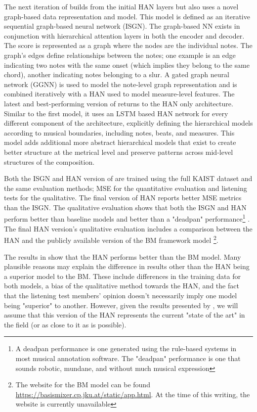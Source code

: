 The next iteration of \vnet{} builds from the initial HAN layers but also uses a novel graph-based data representation and model. This model is defined as an iterative sequential graph-based neural network (ISGN). The graph-based NN exists in conjunction with hierarchical attention layers in both the encoder and decoder. The score is represented as a graph where the nodes are the individual notes. The graph's edges define relationships between the notes; one example is an edge indicating two notes with the same onset (which implies they belong to the same chord), another indicating notes belonging to a slur. A gated graph neural network (GGNN) is used to model the note-level graph representation and is combined iteratively with a HAN used to model measure-level features. The latest and best-performing version of \vnet{}\cite{jeong2019virtuosonet} returns to the HAN only architecture. Similar to the first \vnet{} model, it uses an LSTM based HAN network for every different component of the architecture, explicitly defining the hierarchical models according to musical boundaries, including notes, beats, and measures. This model adds additional more abstract hierarchical models that exist to create better structure at the metrical level and preserve patterns across mid-level structures of the composition.

Both the ISGN\cite{jeong2019graph} and HAN\cite{jeong2019virtuosonet} version of \vnet{} are trained using the full KAIST dataset and the same evaluation methods; MSE for the quantitative evaluation and listening tests for the qualitative. The final version of HAN reports better MSE metrics than the ISGN. The qualitative evaluation shows that both the ISGN and HAN perform better than baseline models and better than a "deadpan" performance\footnote{A deadpan performance is one generated using the rule-based systems in most musical annotation software. The "deadpan" performance is one that sounds robotic, mundane, and without much musical expression} . The final HAN version's qualitative evaluation includes a comparison between the HAN and the publicly available version of the BM framework model \footnote{The website for the BM model can be found \href{here}{https://basismixer.cp.jku.at/static/app.html}. At the time of this writing, the website is currently unavailable}. 

The results in \cite{jeong2019virtuosonet} show that the HAN performs better than the BM model. Many plausible reasons may explain the difference in results other than the HAN being a superior model to the BM. These include differences in the training data for both models, a bias of the qualitative method towards the HAN, and the fact that the listening test members' opinion doesn't necessarily imply one model being "superior" to another. However, given the results presented by \citet{jeong2019virtuosonet}, we will assume that this version of the HAN represents the current "state of the art" in the field (or as close to it as is possible). 


